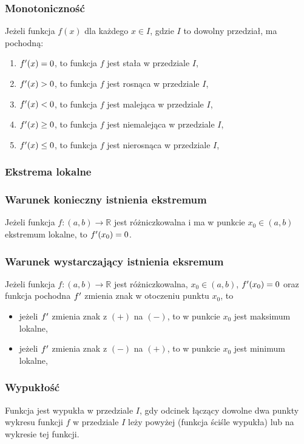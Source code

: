 \documentclass[../Matematyka.tex]{subfiles}
\begin{document}
    \subsubsection{Monotoniczność}
    Jeżeli funkcja \(f(x)\) dla każdego \(x \in I\), gdzie \(I\) to dowolny przedział, ma pochodną:
    \begin{enumerate}
        \item \(f^\prime(x) = 0\), to funkcja \(f\) jest stała w przedziale \(I\),
        \item \(f^\prime(x) > 0\), to funkcja \(f\) jest rosnąca w przedziale \(I\),
        \item \(f^\prime(x) < 0\), to funkcja \(f\) jest malejąca w przedziale \(I\),
        \item \(f^\prime(x) \geq 0\), to funkcja \(f\) jest niemalejąca w przedziale \(I\),
        \item \(f^\prime(x) \leq 0\), to funkcja \(f\) jest nierosnąca w przedziale \(I\),
    \end{enumerate}

    \subsubsection{Ekstrema lokalne}
    \subsubsection*{Warunek konieczny istnienia ekstremum}
    Jeżeli funkcja \(f:(a, b) \rightarrow \mathbb{R}\) jest różniczkowalna i ma w punkcie \(x_0 \in (a,b)\) ekstremum lokalne, to \(f^\prime(x_0) = 0\).

    \subsubsection*{Warunek wystarczający istnienia eksremum}
    Jeżeli funkcja \(f:(a, b) \rightarrow \mathbb{R}\) jest różniczkowalna, \(x_0 \in (a,b)\), \(f^\prime(x_0) = 0\) oraz funkcja pochodna \(f^\prime\) zmienia znak w otoczeniu punktu \(x_0\), to
    \begin{itemize}
        \item jeżeli \(f^\prime\) zmienia znak z \((+)\) na \((-)\), to w punkcie \(x_0\) jest maksimum lokalne,
        \item jeżeli \(f^\prime\) zmienia znak z \((-)\) na \((+)\), to w punkcie \(x_0\) jest minimum lokalne,
    \end{itemize}

    \newpage
    \subsubsection{Wypukłość}
    Funkcja jest wypukła w przedziale \(I\), gdy odcinek łączący dowolne dwa punkty wykresu funkcji \(f\) w przedziale \(I\) leży powyżej (funkcja ściśle wypukła) lub na wykresie tej funkcji.
\end{document}
